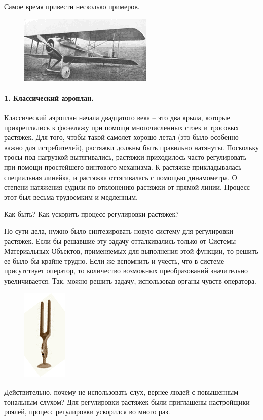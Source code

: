 \documentclass[11pt,a4paper]{article}
\begin{document}
Самое время привести несколько примеров. 

\begin{figure}
\includegraphics[width=.3\textwidth]{mts-4.png}
\end{figure}
\paragraph{1. Классический аэроплан.}
Классический аэроплан начала двадцатого века – это два крыла, которые
прикреплялись к фюзеляжу при помощи многочисленных стоек и тросовых
растяжек. Для того, чтобы такой самолет хорошо летал (это было особенно важно
для истребителей), растяжки должны быть правильно натянуты. Поскольку тросы
под нагрузкой вытягивались, растяжки приходилось часто регулировать при помощи
простейшего винтового механизма. К растяжке прикладывалась специальная
линейка, и растяжка оттягивалась с помощью динамометра. О степени натяжения
судили по отклонению растяжки от прямой линии. Процесс этот был весьма
трудоемким и медленным.

Как быть? Как ускорить процесс регулировки растяжек?

По сути дела, нужно было синтезировать новую систему для регулировки
растяжек. Если бы решавшие эту задачу отталкивались только от Системы
Материальных Объектов, применяемых для выполнения этой функции, то решить ее
было бы крайне трудно. Если же вспомнить и учесть, что в системе присутствует
оператор, то количество возможных преобразований значительно
увеличивается. Так, можно решить задачу, использовав органы чувств оператора.

\begin{figure}
\includegraphics[width=.1\textwidth]{mts-5.png}
\end{figure}
Действительно, почему не использовать слух, вернее людей с повышенным
тональным слухом? Для регулировки растяжек были приглашены настройщики роялей,
процесс регулировки ускорился во много раз.
\end{document}
